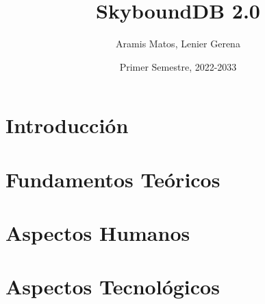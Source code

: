 \documentclass{report}
\title{SkyboundDB 2.0}
\author{Aramis Matos, Lenier Gerena}
\date{Primer Semestre, 2022-2033}
\begin{document}
\renewcommand{\acronymname}{Acrónimos}
\renewcommand{\bibname}{Referencias Bibliográficas}
\renewcommand{\contentsname}{Tabla de Contenido}
\renewcommand{\chaptername}{Capítulo}
\renewcommand{\figurename}{Figura}
\renewcommand{\tablename}{Tabla}

\maketitle

\tableofcontents

\chapter{Introducción}



\chapter{Fundamentos Teóricos}



\chapter{Aspectos Humanos}



\chapter{Aspectos Tecnológicos}



\printglossary[type=\acronymtype]




\end{document}
